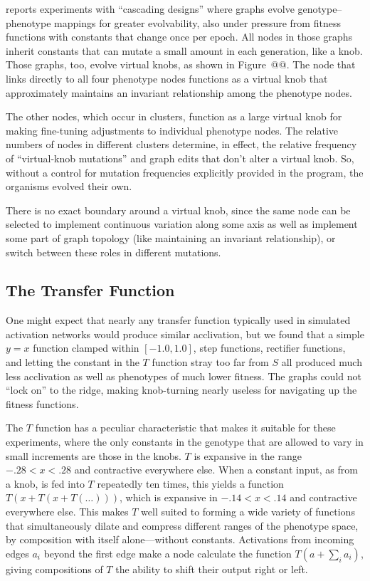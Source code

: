 \documentclass[letterpaper]{article}
\begin{document}
\citet{kovitz2015experiments} reports experiments with ``cascading designs''
where graphs evolve genotype--phenotype mappings for greater evolvability, also
under pressure from fitness functions with constants that change once per epoch.
All nodes in those graphs inherit constants that can mutate a small amount in
each generation, like a knob. Those graphs, too, evolve virtual knobs, as shown
in Figure~@@. The node that links directly to all four phenotype nodes functions
as a virtual knob that approximately maintains an invariant relationship
among the phenotype nodes.

The other nodes, which occur in clusters, function as a large virtual knob for
making fine-tuning adjustments to individual phenotype nodes.  The relative
numbers of nodes in different clusters determine, in effect, the relative
frequency of ``virtual-knob mutations'' and graph edits that don't alter a
virtual knob. So, without a control for mutation frequencies explicitly provided
in the program, the organisms evolved their own.

There is no exact boundary around a virtual knob, since the same node can be
selected to implement continuous variation along some axis as well as implement
some part of graph topology (like maintaining an invariant relationship), or
switch between these roles in different mutations.

\subsection{The Transfer Function}

One might expect that nearly any transfer function typically used in simulated
activation networks would produce similar acclivation, but we found that a
simple $y=x$ function clamped within $[-1.0, 1.0]$, step functions, rectifier
functions, and letting the constant in the $T$ function stray too far from $S$
all produced much less acclivation as well as phenotypes of much lower fitness.
The graphs could not ``lock on'' to the ridge, making knob-turning nearly
useless for navigating up the fitness functions.

The $T$ function has a peculiar characteristic that makes it suitable for
these experiments, where the only constants in the genotype that are allowed to
vary in small increments are those in the knobs. $T$ is expansive in the range
$-.28 < x < .28$ and contractive everywhere else. When a constant input, as
from a knob, is fed into $T$ repeatedly ten times, this yields a function
$T(x+T(x+T(\ldots)))$, which is expansive in $-.14 < x < .14$ and contractive
everywhere else. This makes $T$ well suited to forming a wide variety of
functions that simultaneously dilate and compress different ranges of the
phenotype space, by composition with itself alone---without constants.
Activations from incoming edges $a_{i}$ beyond the first edge make a node
calculate the function $T(a + \sum_i a_i)$, giving compositions of $T$ the
ability to shift their output right or left.
\end{document}
